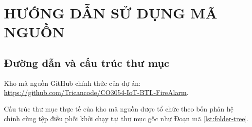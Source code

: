
\section{HƯỚNG DẪN SỬ DỤNG MÃ NGUỒN}
\label{sec:huong-dan-ma-nguon}

\subsection{Đường dẫn và cấu trúc thư mục}
\label{subsec:cau-truc-thu-muc}

Kho mã nguồn GitHub chính thức của dự án: \url{https://github.com/Tricancode/CO3054-IoT-BTL-FireAlarm}.

Cấu trúc thư mục thực tế của kho mã nguồn được tổ chức theo bốn phân hệ chính cùng tệp điều phối khởi chạy tại thư mục gốc như Đoạn mã \ref{lst:folder-tree}.

